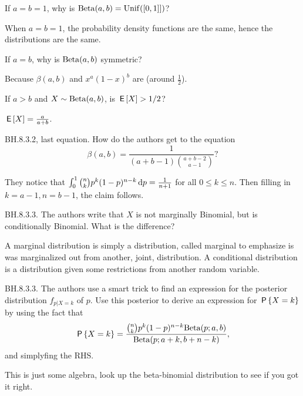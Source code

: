 \begin{exercise}
If $a=b=1$, why is $\Beta{a,b}=\Unif{[0,1]]}$?
\begin{solution}
When $a=b=1$, the probability density functions are the same, hence the distributions are the same.
\end{solution}
\end{exercise}


\begin{exercise}
If $a=b$, why is $\Beta{a,b}$ symmetric?
\begin{solution}
Because $\beta(a,b)$ and $x^a(1-x)^b$ are (around $\frac12$).
\end{solution}
\end{exercise}

\begin{exercise}
If $a>b$ and  $X\sim\Beta{a,b}$, is $\E X > 1/2$?
\begin{solution}
$\E{X} = \frac{a}{a+b}$.
\end{solution}
\end{exercise}

\begin{exercise}
BH.8.3.2, last equation. How do the authors get to the equation
\begin{equation*}
\beta(a,b) = \frac{1}{(a+b-1) {a+b-2\choose a-1}}?
\end{equation*}
\begin{solution}
They notice that $\int_0^1\binom n k p^k(1-p)^{n-k}\d p = \frac1{n+1}$ for all $0\leq k\leq n$. Then filling in $k=a-1,n=b-1$, the claim follows.
\end{solution}
\end{exercise}

\begin{exercise}
BH.8.3.3. The authors write that $X$ is not marginally Binomial, but is conditionally Binomial. What is the difference?
\begin{solution}
A marginal distribution is simply a distribution, called marginal to emphasize is was marginalized out from another, joint, distribution. A conditional distribution is a distribution given some restrictions from another random variable.
\end{solution}
\end{exercise}

\begin{exercise}
BH.8.3.3. The authors use a smart trick to find an expression for the posterior distribution $f_{p|X=k}$ of $p$. Use this posterior to derive an expression for $\P{X=k}$ by using the fact that
\begin{equation*}
\P{X=k} = \frac{{n\choose k} p^{k}(1-p)^{n-k} \Beta{p;a,b}}{\Beta{p;a+k, b+n-k}},
\end{equation*}
and simplyfing the RHS.
\begin{solution}
This is just some algebra, look up the beta-binomial distribution to see if you got it right.
\end{solution}
\end{exercise}

